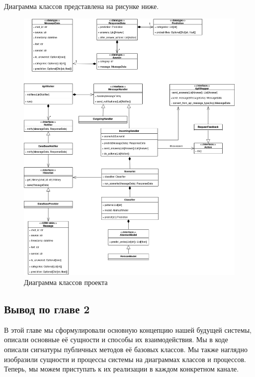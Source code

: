     Диаграмма классов представлена на рисунке ниже.

    \begin{figure}[H]
        \centering
        \includegraphics[width=\linewidth]{static/ClassDiagram.png}
        \caption{Диаграмма классов проекта}
        \label{fig:class-diagram}
    \end{figure}


    \subsection*{Вывод по главе 2}
    В этой главе мы сформулировали основную концепцию нашей будущей системы, 
    описали основные её сущности и способы их взаимодействия. Мы в коде описали 
    сигнатуры публичных методов её базовых классов.
    Мы также наглядно изобразили сущности и процессы системы на диаграммах классов
    и процессов.
    Теперь, мы можем приступать к их реализации в каждом конкретном канале.
